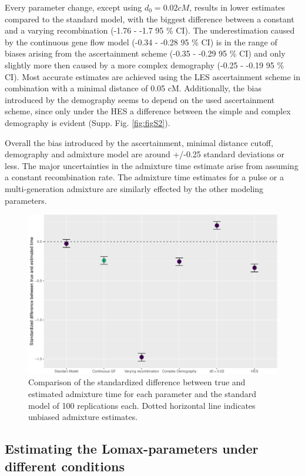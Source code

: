 \documentclass[]{article}
\begin{document}
Every parameter change, except using \(d_{0} = 0.02 cM\), results in lower estimates compared to the
standard model, with the biggest difference between a constant and a
varying recombination (-1.76 - -1.7 95 \% CI). The
underestimation caused by the continuous gene flow model (-0.34 -
-0.28 95 \% CI) is in the range of biases arising from the ascertainment scheme (-0.35 -
-0.29 95 \% CI) and only slightly more then caused by a more complex demography (-0.25 -
-0.19 95 \% CI). Most accurate estimates are achieved using the LES
ascertainment scheme in combination with a minimal distance of 0.05 cM.
Additionally, the bias introduced by the demography seems to depend on
the used ascertainment scheme, since only under the HES a difference
between the simple and complex demography is evident (Supp. Fig.
\ref{fig:figS2}).

Overall the bias introduced by the ascertainment, minimal distance
cutoff, demography and admixture model are  around +/-0.25 standard deviations or less. The major uncertainties in the admixture time
estimate arise from assuming a constant recombination rate. The
admixture time estimates for a pulse or a multi-generation admixture are similarly effected by the other modeling parameters.

\begin{figure}
\centering
\includegraphics{Admixture_Time_Inference_Paper_Draft_files/figure-latex/fig3-1.pdf}
\caption{\label{fig:fig3} Comparison of the standardized difference between true and estimated admixture time for each parameter and the standard model of 100 replications each. Dotted horizontal line indicates unbiased admixture estimates.}
\end{figure}

\subsection{Estimating the Lomax-parameters under different conditions}\label{estimating the Lomax-parameters under different conditions}
\end{document}
